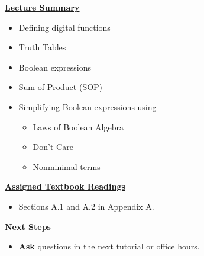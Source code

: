 \begin{frame}[fragile]
 \underline{\textbf{Lecture Summary}}
 \begin{itemize}
 \item Defining digital functions 
 \item Truth Tables
 \item Boolean expressions
 \item Sum of Product (SOP) 
 \item Simplifying Boolean expressions using
 \begin{itemize}
     \item Laws of Boolean Algebra 
     \item Don't Care
     \item Nonminimal terms
 \end{itemize} 
 \end{itemize}
 \underline{\textbf{Assigned Textbook Readings}}
\begin{itemize}
     \item Sections A.1 and A.2 in Appendix A. 
     \end{itemize}
    \underline{\textbf{Next Steps}}
    \begin{itemize}
    \item \textbf{Ask} questions in the next tutorial or office hours.
 \end{itemize}

 \end{frame}





